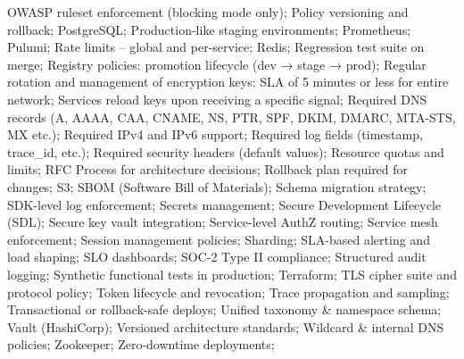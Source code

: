 \documentclass[letterpaper,11pt]{article}
\begin{document}
\begin{multicols}{4}
{\begin{itemize}[leftmargin=0.1in, label={}, itemsep=0pt, parsep=0pt, topsep=0pt, partopsep=0pt]
OWASP ruleset enforcement (blocking mode only);
Policy versioning and rollback;
PostgreSQL;
Production-like staging environments;
Prometheus;
Pulumi;
Rate limits – global and per-service;
Redis;
Regression test suite on merge;
Registry policies: promotion lifecycle (dev → stage → prod);
Regular rotation and management of encryption keys: SLA of 5 minutes or less for entire network; Services reload keys upon receiving a specific signal;
Required DNS records (A, AAAA, CAA, CNAME, NS, PTR, SPF, DKIM, DMARC, MTA-STS, MX etc.);
Required IPv4 and IPv6 support;
Required log fields (timestamp, trace\_id, etc.);
Required security headers (default values);
Resource quotas and limits;
RFC Process for architecture decisions;
Rollback plan required for changes;
S3;
SBOM (Software Bill of Materials);
Schema migration strategy;
SDK-level log enforcement;
Secrets management;
Secure Development Lifecycle (SDL);
Secure key vault integration;
Service-level AuthZ routing;
Service mesh enforcement;
Session management policies;
Sharding;
SLA-based alerting and load shaping;
SLO dashboards;
SOC-2 Type II compliance;
Structured audit logging;
Synthetic functional tests in production;
Terraform;
TLS cipher suite and protocol policy;
Token lifecycle and revocation;
Trace propagation and sampling;
Transactional or rollback-safe deploys;
Unified taxonomy \& namespace schema;
Vault (HashiCorp);
Versioned architecture standards;
Wildcard \& internal DNS policies;
Zookeeper;
Zero-downtime deployments;


\end{itemize}}
\end{multicols}
\end{document}
